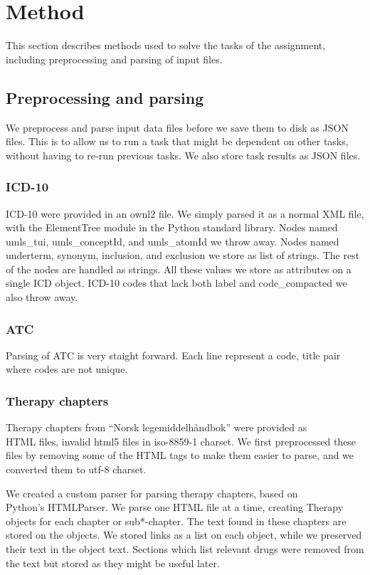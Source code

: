 \chapter{Method}
\label{cha:method}
This section describes methods used to solve the tasks of the assignment, including
preprocessing and parsing of input files.


\section{Preprocessing and parsing}
We preprocess and parse input data files before we save them to disk as JSON
files. This is to allow us to run a task that might be dependent on other tasks, without having to re-run previous tasks. We also store task
results as JSON files.

\subsection{ICD-10}
ICD-10 were provided in an ownl2 file. We simply parsed it as a normal XML
file, with the ElementTree module in the Python standard library.
Nodes named umls\_tui, umls\_conceptId, and umls\_atomId we throw away.
Nodes named underterm, synonym, inclusion, and exclusion we store as list of
strings. The rest of the nodes are handled as strings. All these values we
store as attributes on a single ICD object. ICD-10 codes that lack both label
and code\_compacted we also throw away.

\subsection{ATC}
Parsing of ATC is very staight forward. Each line represent a code, title
pair where codes are not unique.

\subsection{Therapy chapters}
Therapy chapters from ``Norsk legemiddelhåndbok'' were provided as\\
HTML files, invalid html5 files in iso-8859-1 charset. We first preprocessed
these files by removing some of the HTML tags to make them easier to parse,
and we converted them to utf-8 charset.

We created a custom parser for parsing therapy chapters, based on\\
Python's HTMLParser. We parse one HTML file at a time, creating Therapy
objects for each chapter or sub*-chapter. The text found in these chapters are
stored on the objects. We stored links as a list on each object, while we
preserved their text in the object text. Sections which list relevant drugs
were removed from the text but stored as they might be useful later.

